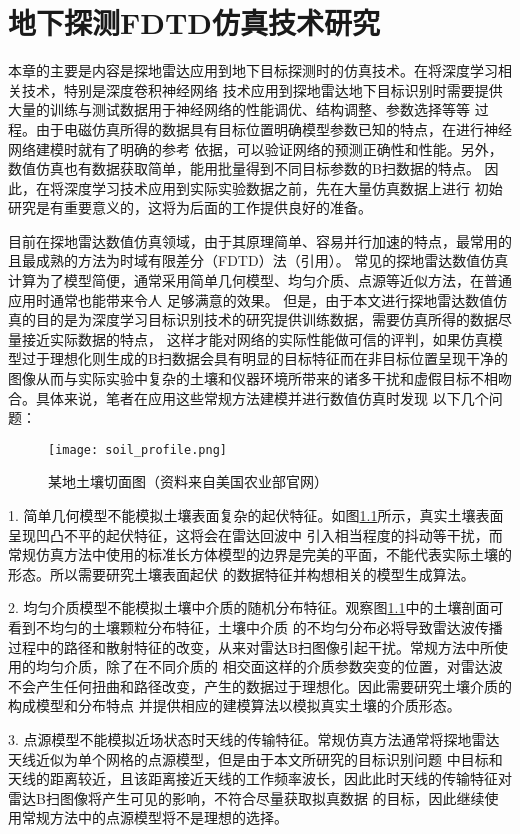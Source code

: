 \chapter{地下探测FDTD仿真技术研究}
本章的主要是内容是探地雷达应用到地下目标探测时的仿真技术。在将深度学习相关技术，特别是深度卷积神经网络
技术应用到探地雷达地下目标识别时需要提供大量的训练与测试数据用于神经网络的性能调优、结构调整、参数选择等等
过程。由于电磁仿真所得的数据具有目标位置明确模型参数已知的特点，在进行神经网络建模时就有了明确的参考
依据，可以验证网络的预测正确性和性能。另外，数值仿真也有数据获取简单，能用批量得到不同目标参数的B扫数据的特点。
因此，在将深度学习技术应用到实际实验数据之前，先在大量仿真数据上进行
初始研究是有重要意义的，这将为后面的工作提供良好的准备。

目前在探地雷达数值仿真领域，由于其原理简单、容易并行加速的特点，最常用的且最成熟的方法为时域有限差分（FDTD）法（引用）。
常见的探地雷达数值仿真计算为了模型简便，通常采用简单几何模型、均匀介质、点源等近似方法，在普通应用时通常也能带来令人
足够满意的效果。
但是，由于本文进行探地雷达数值仿真的目的是为深度学习目标识别技术的研究提供训练数据，需要仿真所得的数据尽量接近实际数据的特点，
这样才能对网络的实际性能做可信的评判，如果仿真模型过于理想化则生成的B扫数据会具有明显的目标特征而在非目标位置呈现干净的
图像从而与实际实验中复杂的土壤和仪器环境所带来的诸多干扰和虚假目标不相吻合。具体来说，笔者在应用这些常规方法建模并进行数值仿真时发现
以下几个问题：
\begin{figure}[htbp]
	\texttt{[image: soil\_profile.png]}
	\caption{某地土壤切面图（资料来自美国农业部官网）}
	\label{soil_profile}
\end{figure}

1. 简单几何模型不能模拟土壤表面复杂的起伏特征。如图\ref{soil_profile}所示，真实土壤表面呈现凹凸不平的起伏特征，这将会在雷达回波中
引入相当程度的抖动等干扰，而常规仿真方法中使用的标准长方体模型的边界是完美的平面，不能代表实际土壤的形态。所以需要研究土壤表面起伏
的数据特征并构想相关的模型生成算法。

2. 均匀介质模型不能模拟土壤中介质的随机分布特征。观察图\ref{soil_profile}中的土壤剖面可看到不均匀的土壤颗粒分布特征，土壤中介质
的不均匀分布必将导致雷达波传播过程中的路径和散射特征的改变，从来对雷达B扫图像引起干扰。常规方法中所使用的均匀介质，除了在不同介质的
相交面这样的介质参数突变的位置，对雷达波不会产生任何扭曲和路径改变，产生的数据过于理想化。因此需要研究土壤介质的构成模型和分布特点
并提供相应的建模算法以模拟真实土壤的介质形态。

3. 点源模型不能模拟近场状态时天线的传输特征。常规仿真方法通常将探地雷达天线近似为单个网格的点源模型，但是由于本文所研究的目标识别问题
中目标和天线的距离较近，且该距离接近天线的工作频率波长，因此此时天线的传输特征对雷达B扫图像将产生可见的影响，不符合尽量获取拟真数据
的目标，因此继续使用常规方法中的点源模型将不是理想的选择。

